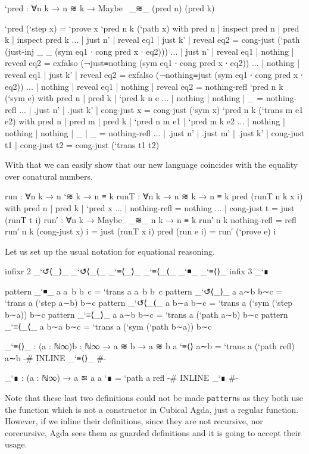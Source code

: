 \begin{code}
`pred : ∀{n k} → n ≋ k → Maybe~ _≋_ (pred n) (pred k)
\end{code}
\begin{code}[hide]
`pred (`step x) = `prove x
`pred {n} {k} (`path x) with pred n | inspect pred n | pred k | inspect pred k
... | just n' | reveal eq1 | just k' | reveal eq2 = cong-just (`path (just-inj _ _ (sym eq1 ∙ cong pred x ∙ eq2)))
... | just n' | reveal eq1 | nothing | reveal eq2 = exfalso (¬just≡nothing (sym eq1 ∙ cong pred x ∙ eq2))
... | nothing | reveal eq1 | just k' | reveal eq2 = exfalso (¬nothing≡just (sym eq1 ∙ cong pred x ∙ eq2))
... | nothing | reveal eq1 | nothing | reveal eq2 = nothing-refl
`pred {n} {k} (`sym e) with pred n | pred k | `pred {k} {n} e
... | nothing  | nothing  | _ = nothing-refl
... | .just n' | .just k' | cong-just x = cong-just (`sym x)
`pred {n} {k} (`trans {m} e1 e2) with pred n | pred m | pred k | `pred {n} {m} e1 | `pred {m} {k} e2
... | nothing  | nothing  | nothing  | _  | _  = nothing-refl
... | .just n' | .just m' | .just k' | cong-just t1 | cong-just t2 = cong-just (`trans t1 t2)
\end{code}

With that we can easily show that our new language coincides with the equality over conatural numbers.

\begin{code}
run : ∀{n k} → n `≋ k → n ≡ k
runT : ∀{n k} → n ≋ k → n ≡ k
pred (runT {n} {k} x i) with {pred n} | {pred k} | `pred x
... | nothing-refl = nothing
... | cong-just t = just (runT t i)
run′ : ∀{n k} → Maybe~ _≋_ n k → n ≡ k
run′ {n} {k} nothing-refl = refl
run′ {n} {k} (cong-just x) i = just (runT x i)
pred (run e i) = run′ (`prove e) i
\end{code}

Let us set up the usual notation for equational reasoning.

\begin{code}[hide]
infixr 2 _`↺⟨_⟩_ _`↺⟨_⟨_ _`≡⟨_⟩_ _`≡⟨_⟨_ _`◾_ _`≡⟨⟩_
infix  3 _`∎
\end{code}
\begin{code}
pattern _`◾_ {a} a~b b~c = `trans {a} a~b b~c
pattern _`↺⟨_⟩_ a a∼b b∼c = `trans {a} (`step a∼b) b∼c
pattern _`↺⟨_⟨_ a b∼a b∼c = `trans {a} (`sym (`step b∼a)) b∼c
pattern _`≡⟨_⟩_ a a∼b b∼c = `trans {a} (`path a∼b) b∼c
pattern _`≡⟨_⟨_ a b∼a b∼c = `trans {a} (`sym (`path b∼a)) b∼c

_`≡⟨⟩_ : (a : ℕ∞){b : ℕ∞} → a ≋ b → a ≋ b
a `≡⟨⟩ a∼b = `trans {a} (`path refl) a∼b
{-# INLINE _`≡⟨⟩_ #-}

_`∎ : (a : ℕ∞) → a ≋ a
a `∎ = `path  {a} refl
{-# INLINE _`∎ #-}
\end{code}

Note that these last two definitions could not be made \texttt{pattern}s
as they both use the  function which is not a constructor
in Cubical Agda, just a regular function. However, if we inline their definitions,
since they are not recursive, nor corecursive, Agda sees them as guarded definitions
and it is going to accept their usage.
